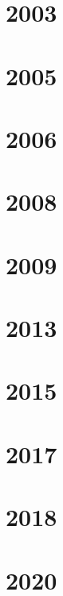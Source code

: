 \section{2003}


\section{2005}



\section{2006}


\section{2008}


\section{2009}

\section{2013}


\section{2015}

\section{2017}

\section{2018}

\section{2020}




